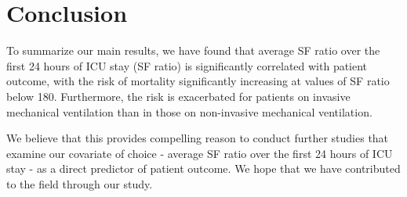 
\chapter{Conclusion} %

\label{Chapter7} %


To summarize our main results, we have found that average SF ratio over the first 24 hours of ICU stay (SF ratio) is significantly correlated with patient outcome, with the risk of  mortality significantly increasing at values of SF ratio below 180. Furthermore, the risk is exacerbated for patients on invasive mechanical ventilation than in those on non-invasive mechanical ventilation. 

We believe that this provides compelling reason to conduct further studies that examine our covariate of choice - average SF ratio over the first 24 hours of ICU stay - as a direct predictor of patient outcome. We hope that we have contributed to the field through our study. 